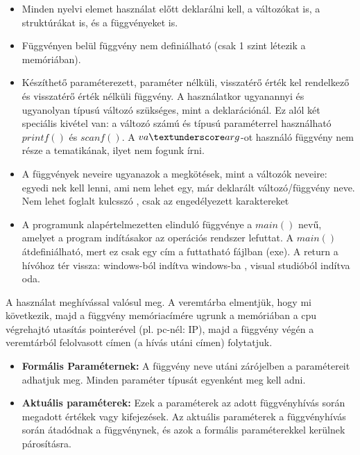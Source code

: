 \documentclass[11pt,a4paper]{article}
\begin{document}
            \begin{tcolorbox}[colback=blue!5!white,colframe=blue!50!black,title= 57. Ismertesse a függvények írásának és paraméterezésének nyelvi szabályait a C nyelvben!]
                \begin{itemize}
                    \item Minden nyelvi elemet használat előtt deklarálni kell, a változókat is, a struktúrákat is, és a függvényeket is.
                    \item Függvényen belül függvény nem definiálható (csak 1 szint létezik a memóriában).
                    \item Készíthető paraméterezett, paraméter nélküli, visszatérő érték kel rendelkező és visszatérő érték nélküli függvény. A használatkor ugyanannyi és ugyanolyan típusú változó szükséges, mint a deklarációnál. Ez alól két speciális kivétel van: a változó számú és típusú paraméterrel használható \(printf()\) és \(scanf()\). A \(va \textunderscore arg\)-ot használó függvény nem része a tematikának, ilyet nem fogunk írni.
                    \item A függvények neveire ugyanazok a megkötések, mint a változók neveire: egyedi nek kell lenni, ami nem lehet egy, már deklarált változó/függvény neve. Nem lehet foglalt kulcsszó , csak az engedélyezett karaktereket
                    \item A programunk alapértelmezetten elinduló függvénye a \(main()\) nevű, amelyet a program indításakor az operációs rendszer lefuttat. A \(main()\) átdefiniálható, mert ez csak egy cím a futtatható fájlban (exe). A return a hívóhoz tér vissza: windows-ból indítva windows-ba , visual studióból indítva oda.
                    
                \end{itemize}
                A használat meghívással valósul meg. A veremtárba elmentjük, hogy mi következik, majd a függvény memóriacímére ugrunk a memóriában a cpu végrehajtó utasítás pointerével (pl. pc-nél: IP), majd a függvény végén a veremtárból felolvasott címen (a hívás utáni címen) folytatjuk.
            \end{tcolorbox}

            \begin{tcolorbox}[colback=blue!5!white,colframe=blue!50!black,title= 58. Ismertesse a formális és aktuális paraméter fogalmát a C nyelv függvényeinél!]
                \begin{itemize}
                    \item \textbf{Formális Paraméternek:} A függvény neve utáni zárójelben a paramétereit adhatjuk meg. Minden paraméter típusát egyenként meg kell adni.
                    \item \textbf{Aktuális paraméterek:} Ezek a paraméterek az adott függvényhívás során megadott értékek vagy kifejezések. Az aktuális paraméterek a függvényhívás során átadódnak a függvénynek, és azok a formális paraméterekkel kerülnek párosításra.
                \end{itemize}
            \end{tcolorbox}
\end{document}
